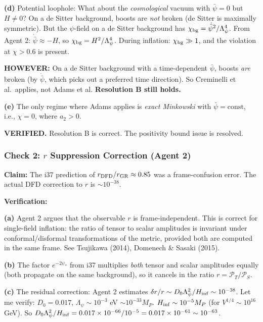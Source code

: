 \documentclass[11pt,a4paper]{article}
\begin{document}
\textbf{(d)} Potential loophole: What about the \emph{cosmological} vacuum with $\bar{\psi} = 0$ but $H \neq 0$? On a de Sitter background, boosts are \emph{not} broken (de Sitter is maximally symmetric). But the $\psi$-field on a de Sitter background has $\chi_{\rm bg} = \dot{\bar{\psi}}^2/\Lambda_\psi^4$. From Agent 2: $\dot{\bar{\psi}} \approx -H$, so $\chi_{\rm bg} = H^2/\Lambda_\psi^4$. During inflation: $\chi_{\rm bg} \gg 1$, and the violation at $\chi > 0.6$ is present.

\textbf{HOWEVER:} On a de Sitter background with a time-dependent $\bar{\psi}$, boosts \emph{are} broken (by $\dot{\bar{\psi}}$, which picks out a preferred time direction). So Creminelli et al.\ applies, not Adams et al. \textbf{Resolution B still holds.}

\textbf{(e)} The only regime where Adams applies is \emph{exact Minkowski} with $\bar{\psi} = \text{const}$, i.e., $\chi = 0$, where $a_2 > 0$.

\textcolor{dfdgreen}{\textbf{VERIFIED.}} Resolution B is correct. The positivity bound issue is resolved.

\subsubsection{Check 2: $r$ Suppression Correction (Agent 2)}

\textbf{Claim:} The i37 prediction of $r_{\rm DFD}/r_{\rm GR} \approx 0.85$ was a frame-confusion error. The actual DFD correction to $r$ is $\sim 10^{-38}$.

\textbf{Verification:}

\textbf{(a)} Agent 2 argues that the observable $r$ is frame-independent. This is correct for single-field inflation: the ratio of tensor to scalar amplitudes is invariant under conformal/disformal transformations of the metric, provided both are computed in the same frame. See Tsujikawa (2014), Domenech \& Sasaki (2015).

\textbf{(b)} The factor $e^{-2\psi_*}$ from i37 multiplies \emph{both} tensor and scalar amplitudes equally (both propagate on the same background), so it cancels in the ratio $r = \mathcal{P}_T/\mathcal{P}_S$.

\textbf{(c)} The residual correction: Agent 2 estimates $\delta r/r \sim D_0\Lambda_\psi^2/H_{\rm inf} \sim 10^{-38}$. Let me verify: $D_0 = 0.017$, $\Lambda_\psi \sim 10^{-3}$ eV $\sim 10^{-33} M_P$. $H_{\rm inf} \sim 10^{-5} M_P$ (for $V^{1/4} \sim 10^{16}$ GeV). So $D_0\Lambda_\psi^2/H_{\rm inf} = 0.017 \times 10^{-66}/10^{-5} = 0.017 \times 10^{-61} \sim 10^{-63}$.
\end{document}
